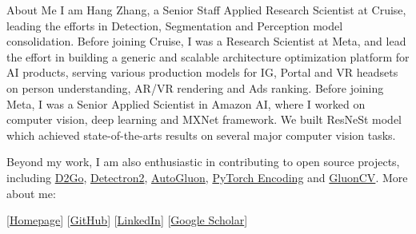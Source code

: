 \documentclass{resume} %
\begin{document}
\begin{rSection}{About Me}
I am Hang Zhang, a Senior Staff Applied Research Scientist at Cruise, leading the efforts in Detection, Segmentation and Perception model consolidation. 
Before joining Cruise, I was a Research Scientist at Meta, and lead the effort in building a generic and scalable architecture optimization platform for AI products, serving various production models for IG, Portal and VR headsets on person understanding, AR/VR rendering and Ads ranking.
Before joining Meta, I was a Senior Applied Scientist in Amazon AI, where I worked on computer vision, deep learning and MXNet framework. We built ResNeSt model which achieved state-of-the-arts results on several major computer vision tasks.


Beyond my work, I am also enthusiastic in contributing to open source projects, including \href{https://github.com/facebookresearch/d2go}{D2Go}, \href{https://github.com/facebookresearch/detectron2}{Detectron2}, \href{https://github.com/awslabs/autogluon/}{AutoGluon}, \href{https://github.com/zhanghang1989/PyTorch-Encoding}{PyTorch Encoding} and \href{https://github.com/dmlc/gluon-cv}{GluonCV}. More about me:


[\href{https://hangzhang.org/}{Homepage}] [\href{https://github.com/zhanghang1989}{GitHub}] 
[\href{https://www.linkedin.com/in/zhanghang0704}{LinkedIn}] 
[\href{https://scholar.google.com/citations?user=gCoWdkUAAAAJ}{Google Scholar}]
\end{rSection}


\newcommand{\RNum}[1]{\uppercase\expandafter{\romannumeral #1\relax}}
\end{document}
